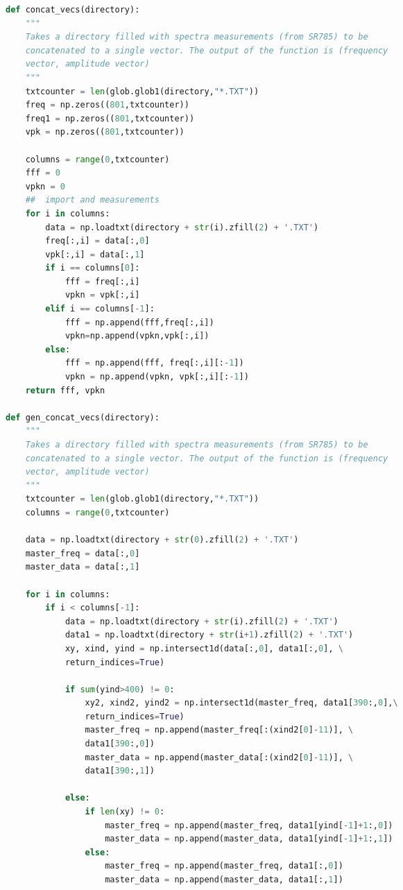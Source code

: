 \begin{spacing}{1} \begin{lstlisting}[frame=single, language=Python]
def concat_vecs(directory):
    """
    Takes a directory filled with spectra measurements (from SR785) to be
    concatenated to a single vector. The output of the function is (frequency
    vector, amplitude vector)
    """
    txtcounter = len(glob.glob1(directory,"*.TXT"))
    freq = np.zeros((801,txtcounter))
    freq1 = np.zeros((801,txtcounter))
    vpk = np.zeros((801,txtcounter))

    columns = range(0,txtcounter)
    fff = 0
    vpkn = 0
    ##  import and measurements
    for i in columns:
        data = np.loadtxt(directory + str(i).zfill(2) + '.TXT')
        freq[:,i] = data[:,0]
        vpk[:,i] = data[:,1]
        if i == columns[0]:
            fff = freq[:,i]
            vpkn = vpk[:,i]
        elif i == columns[-1]:
            fff = np.append(fff,freq[:,i])
            vpkn=np.append(vpkn,vpk[:,i])
        else:
            fff = np.append(fff, freq[:,i][:-1])
            vpkn = np.append(vpkn, vpk[:,i][:-1])
    return fff, vpkn

def gen_concat_vecs(directory):
    """
    Takes a directory filled with spectra measurements (from SR785) to be
    concatenated to a single vector. The output of the function is (frequency
    vector, amplitude vector)
    """
    txtcounter = len(glob.glob1(directory,"*.TXT"))
    columns = range(0,txtcounter)

    data = np.loadtxt(directory + str(0).zfill(2) + '.TXT')
    master_freq = data[:,0]
    master_data = data[:,1]

    for i in columns:
        if i < columns[-1]:
            data = np.loadtxt(directory + str(i).zfill(2) + '.TXT')
            data1 = np.loadtxt(directory + str(i+1).zfill(2) + '.TXT')
            xy, xind, yind = np.intersect1d(data[:,0], data1[:,0], \
            return_indices=True)

            if sum(yind>400) != 0:
                xy2, xind2, yind2 = np.intersect1d(master_freq, data1[390:,0],\
                return_indices=True)
                master_freq = np.append(master_freq[:(xind2[0]-11)], \
                data1[390:,0])
                master_data = np.append(master_data[:(xind2[0]-11)], \
                data1[390:,1])

            else:
                if len(xy) != 0:
                    master_freq = np.append(master_freq, data1[yind[-1]+1:,0])
                    master_data = np.append(master_data, data1[yind[-1]+1:,1])
                else:
                    master_freq = np.append(master_freq, data1[:,0])
                    master_data = np.append(master_data, data1[:,1])


\end{lstlisting}
\end{spacing}

